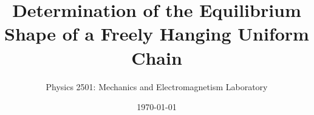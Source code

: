 \documentclass{revtex4}
\begin{document}

\title{Determination of the Equilibrium Shape of a Freely Hanging Uniform Chain}


\author{Physics 2501: Mechanics and Electromagnetism Laboratory}


\date{\today}




\maketitle

\end{document}
